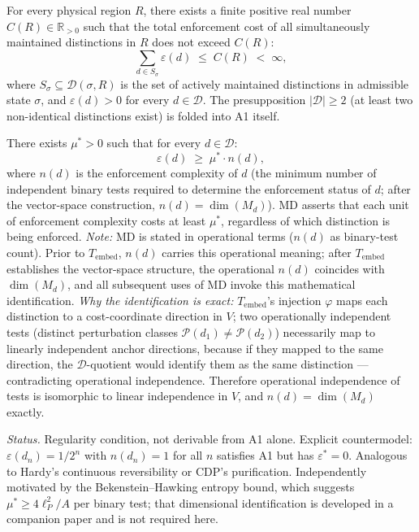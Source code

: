 \documentclass[11pt,a4paper]{article}
\theoremstyle{definition}
\newcommand{\eps}{\varepsilon}
\begin{document}
\begin{tcolorbox}[apfbox, title={A1: Enforcement Capacity is Finite and Positive (Axiom)}]
For every physical region $R$, there exists a finite positive real number $C(R) \in \mathbb{R}_{>0}$ such that the total enforcement cost of all simultaneously maintained distinctions in $R$ does not exceed $C(R)$:
\[
\sum_{d \in S_\sigma} \eps(d) \;\le\; C(R) \;<\; \infty,
\]
where $S_\sigma \subseteq \mathcal{D}(\sigma, R)$ is the set of actively maintained distinctions in admissible state $\sigma$, and $\eps(d) > 0$ for every $d \in \mathcal{D}$.  The presupposition $|\mathcal{D}| \ge 2$ (at least two non-identical distinctions exist) is folded into A1 itself.
\end{tcolorbox}

\begin{tcolorbox}[apfbox, title={MD: Uniform Per-Test Cost Floor (Regularity Condition)}]
There exists $\mu^* > 0$ such that for every $d \in \mathcal{D}$:
\[
\eps(d) \;\ge\; \mu^* \cdot n(d),
\]
where $n(d)$ is the enforcement complexity of $d$ (the minimum number of independent binary tests required to determine the enforcement status of $d$; after the vector-space construction, $n(d) = \dim(M_d)$).  MD asserts that each unit of enforcement complexity costs at least $\mu^*$, regardless of which distinction is being enforced.  \textit{Note:} MD is stated in operational terms ($n(d)$ as binary-test count).  Prior to $T_{\mathrm{embed}}$, $n(d)$ carries this operational meaning; after $T_{\mathrm{embed}}$ establishes the vector-space structure, the operational $n(d)$ coincides with $\dim(M_d)$, and all subsequent uses of MD invoke this mathematical identification.  \textit{Why the identification is exact:}  $T_{\mathrm{embed}}$'s injection $\varphi$ maps each distinction to a cost-coordinate direction in $V$; two operationally independent tests (distinct perturbation classes $\mathcal{P}(d_1) \ne \mathcal{P}(d_2)$) necessarily map to linearly independent anchor directions, because if they mapped to the same direction, the $\mathcal{D}$-quotient would identify them as the same distinction --- contradicting operational independence.  Therefore operational independence of tests is isomorphic to linear independence in $V$, and $n(d) = \dim(M_d)$ exactly.

\smallskip
\noindent\textit{Status.}  Regularity condition, not derivable from A1 alone.  Explicit countermodel: $\eps(d_n) = 1/2^n$ with $n(d_n) = 1$ for all $n$ satisfies A1 but has $\eps^* = 0$.  Analogous to Hardy's continuous reversibility or CDP's purification.  Independently motivated by the Bekenstein--Hawking entropy bound, which suggests $\mu^* \ge 4\ell_P^2/A$ per binary test; that dimensional identification is developed in a companion paper and is not required here.


\end{tcolorbox}
\end{document}
